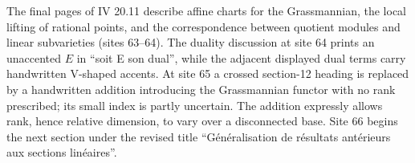 The final pages of IV 20.11 describe affine charts for the Grassmannian, the local lifting of rational points, and the correspondence between quotient modules and linear subvarieties (sites 63--64). The duality discussion at site 64 prints an unaccented $E$ in ``soit E son dual'', while the adjacent displayed dual terms carry handwritten V-shaped accents. At site 65 a crossed section-12 heading is replaced by a handwritten addition introducing the Grassmannian functor with no rank prescribed; its small index is partly uncertain. The addition expressly allows rank, hence relative dimension, to vary over a disconnected base. Site 66 begins the next section under the revised title ``Généralisation de résultats antérieurs aux sections linéaires''.

